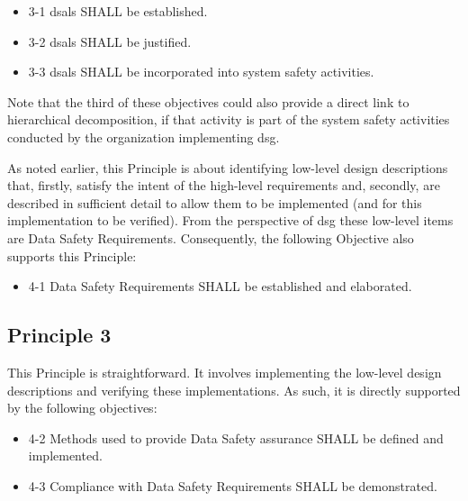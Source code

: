 \begin{itemize}
	\item \textcolor{dsiwgAccentColour}{3-1} \Glspl{dsal} SHALL be established.
	\item \textcolor{dsiwgAccentColour}{3-2} \Glspl{dsal} SHALL be justified.
	\item \textcolor{dsiwgAccentColour}{3-3} \Glspl{dsal} SHALL be incorporated into system safety activities.
\end{itemize}

Note that the third of these objectives could also provide a direct link to hierarchical decomposition, if that activity is part of the system safety activities conducted by the organization implementing \gls{dsg}.

As noted earlier, this Principle is about identifying low-level design descriptions that, firstly, satisfy the intent of the high-level requirements and, secondly, are described in sufficient detail to allow them to be implemented (and for this implementation to be verified). From the perspective of \gls{dsg} these low-level items are Data Safety Requirements. Consequently, the following Objective also supports this Principle:

\begin{itemize}
	\item \textcolor{dsiwgAccentColour}{4-1} Data Safety Requirements SHALL be established and elaborated.
\end{itemize}


\subsection{Principle 3}

This Principle is straightforward. It involves implementing the low-level design descriptions and verifying these implementations. As such, it is directly supported by the following objectives:

\begin{itemize}
	\item \textcolor{dsiwgAccentColour}{4-2} Methods used to provide Data Safety assurance SHALL be defined and implemented.
	\item \textcolor{dsiwgAccentColour}{4-3} Compliance with Data Safety Requirements SHALL be demonstrated.	
\end{itemize}


